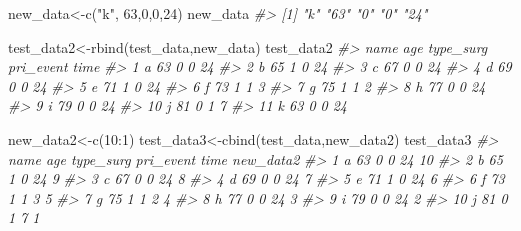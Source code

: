 \documentclass[
]{article}
\newenvironment{Shaded}{\begin{snugshade}}{\end{snugshade}}
\newcommand{\CommentTok}[1]{\textcolor[rgb]{0.56,0.35,0.01}{\textit{#1}}}
\newcommand{\DecValTok}[1]{\textcolor[rgb]{0.00,0.00,0.81}{#1}}
\newcommand{\FunctionTok}[1]{\textcolor[rgb]{0.00,0.00,0.00}{#1}}
\newcommand{\NormalTok}[1]{#1}
\newcommand{\OtherTok}[1]{\textcolor[rgb]{0.56,0.35,0.01}{#1}}
\newcommand{\SpecialCharTok}[1]{\textcolor[rgb]{0.00,0.00,0.00}{#1}}
\newcommand{\StringTok}[1]{\textcolor[rgb]{0.31,0.60,0.02}{#1}}
\begin{document}
\begin{Shaded}
\begin{Highlighting}[]
\NormalTok{new\_data}\OtherTok{\textless{}{-}}\FunctionTok{c}\NormalTok{(}\StringTok{"k"}\NormalTok{, }\DecValTok{63}\NormalTok{,}\DecValTok{0}\NormalTok{,}\DecValTok{0}\NormalTok{,}\DecValTok{24}\NormalTok{)}
\NormalTok{new\_data}
\CommentTok{\#\textgreater{} [1] "k"  "63" "0"  "0"  "24"}

\NormalTok{test\_data2}\OtherTok{\textless{}{-}}\FunctionTok{rbind}\NormalTok{(test\_data,new\_data)}
\NormalTok{test\_data2}
\CommentTok{\#\textgreater{}    name age type\_surg pri\_event time}
\CommentTok{\#\textgreater{} 1     a  63         0         0   24}
\CommentTok{\#\textgreater{} 2     b  65         1         0   24}
\CommentTok{\#\textgreater{} 3     c  67         0         0   24}
\CommentTok{\#\textgreater{} 4     d  69         0         0   24}
\CommentTok{\#\textgreater{} 5     e  71         1         0   24}
\CommentTok{\#\textgreater{} 6     f  73         1         1    3}
\CommentTok{\#\textgreater{} 7     g  75         1         1    2}
\CommentTok{\#\textgreater{} 8     h  77         0         0   24}
\CommentTok{\#\textgreater{} 9     i  79         0         0   24}
\CommentTok{\#\textgreater{} 10    j  81         0         1    7}
\CommentTok{\#\textgreater{} 11    k  63         0         0   24}

\NormalTok{new\_data2}\OtherTok{\textless{}{-}}\FunctionTok{c}\NormalTok{(}\DecValTok{10}\SpecialCharTok{:}\DecValTok{1}\NormalTok{)}
\NormalTok{test\_data3}\OtherTok{\textless{}{-}}\FunctionTok{cbind}\NormalTok{(test\_data,new\_data2)}
\NormalTok{test\_data3}
\CommentTok{\#\textgreater{}    name age type\_surg pri\_event time new\_data2}
\CommentTok{\#\textgreater{} 1     a  63         0         0   24        10}
\CommentTok{\#\textgreater{} 2     b  65         1         0   24         9}
\CommentTok{\#\textgreater{} 3     c  67         0         0   24         8}
\CommentTok{\#\textgreater{} 4     d  69         0         0   24         7}
\CommentTok{\#\textgreater{} 5     e  71         1         0   24         6}
\CommentTok{\#\textgreater{} 6     f  73         1         1    3         5}
\CommentTok{\#\textgreater{} 7     g  75         1         1    2         4}
\CommentTok{\#\textgreater{} 8     h  77         0         0   24         3}
\CommentTok{\#\textgreater{} 9     i  79         0         0   24         2}
\CommentTok{\#\textgreater{} 10    j  81         0         1    7         1}
\end{Highlighting}
\end{Shaded}
\end{document}
